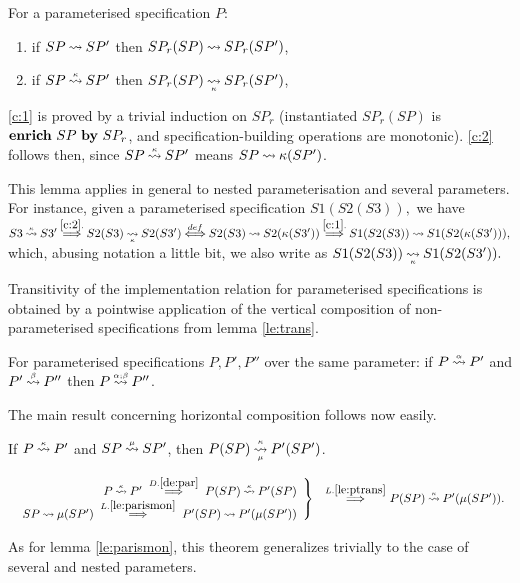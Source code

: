 \begin{LEMMA}\label{le:parismon}
For a parameterised specification $P$:
\begin{enumerate}\MyLPar
\item\label{c:1} if $SP\mathbin{\leadsto} SP'$ then $SP_r(SP)\mathbin{\leadsto} SP_r(SP')$, \item\label{c:2} if $SP\mathbin{\stackrel{\scriptscriptstyle \kappa}{\mathbin{\leadsto}}} SP'$ then $SP_r(SP)\imp{}{\kappa} SP_r(SP')$,
\end{enumerate}
\end{LEMMA}
\begin{PROOF}
\ref{c:1} is proved by a trivial induction on $SP_r$ (instantiated $SP_r(SP)$ is ${\bf enrich\ }SP\ {\bf by}\ SP_r$, and specification-building operations are monotonic). \ref{c:2} follows then, since $SP\mathbin{\stackrel{\scriptscriptstyle \kappa}{\mathbin{\leadsto}}}SP'$ means $SP\mathbin{\leadsto} \kappa(SP')$. \end{PROOF}
\noindent This lemma applies in general to nested parameterisation and several parameters. For instance, given a parameterised specification $S1(S2(S3)),$ we have
$S3\imm\kappa S3'\TTo{\ref{c:2}.} S2(S3)\imp{}{\kappa} S2(S3') \ToT{def} S2(S3)\im S2(\kappa(S3')) \TTo{\ref{c:1}.} S1(S2(S3))\im S1(S2(\kappa(S3'))),$ which, abusing notation a little bit, we also write as $S1(S2(S3))\imp{}{\kappa} S1(S2(S3')).$ %

Transitivity of the implementation relation for parameterised specifications is obtained by a pointwise application of the vertical composition of non-parameterised specifications from lemma \ref{le:trans}. 

\begin{LEMMA}\label{le:ptrans}
For parameterised specifications $P,P',P''$ over the same parameter: if $P\mathbin{\stackrel{\scriptscriptstyle \alpha}{\mathbin{\leadsto}}} P'$ and $P'\mathbin{\stackrel{\scriptscriptstyle \beta}{\mathbin{\leadsto}}} P''$ then $P\mathbin{\stackrel{\scriptscriptstyle \alpha;\beta}{\mathbin{\leadsto}}} P''$. \end{LEMMA}
The main result concerning horizontal composition follows now easily. %

\begin{THEOREM}\label{th:horizontal}
If $P\mathbin{\stackrel{\scriptscriptstyle \kappa}{\mathbin{\leadsto}}} P'$ and $SP\mathbin{\stackrel{\scriptscriptstyle \mu}{\mathbin{\leadsto}}} SP'$, then $P(SP)\imp{\kappa}{\mu} P'(SP')$.
\end{THEOREM}
\begin{PROOF}
\( \begin{array}[t]{rl}
\left . \begin{array}{r}
P\imm{\kappa} P'\ \ovr\Longrightarrow{D.\ref{de:par}}\ 
P(SP)\imm{\kappa}P'(SP) \\
SP\im\mu(SP')\ \ovr\Longrightarrow{L.\ref{le:parismon}}\ P'(SP)\im P'(\mu(SP'))
\end{array} \right \} &
\ovr\Longrightarrow{L.\ref{le:ptrans}}\ P(SP)\imm{\kappa}P'(\mu(SP')). \end{array} \)
\end{PROOF}
\noindent As for lemma \ref{le:parismon}, this theorem generalizes trivially to the case of several and nested parameters. 

